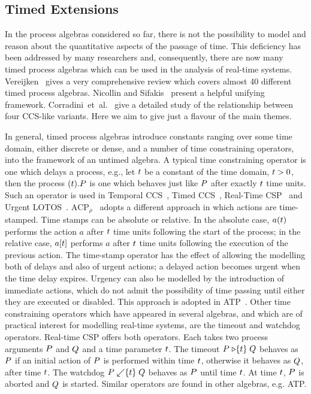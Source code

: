{\subsection{Timed Extensions}
In the process algebras considered so far, there is not the
possibility to model and reason about the quantitative aspects of the
passage of time.  This deficiency has been addressed by many
researchers and, consequently, there are now many timed process
algebras which can be used in the analysis of real-time
systems. Vereijken~\cite{ver:97} gives a very comprehensive review
which covers almost 40 different timed process algebras.  Nicollin and
Sifakis~\cite{ns:91} present a helpful unifying framework.
Corradini~et~al.~\cite{cdi:99} give a detailed study of the
relationship between four CCS-like variants. Here we aim to give just
a flavour of the main themes.

In general, timed process algebras introduce constants ranging over
some time domain, either discrete or dense, and a number of time
constraining operators, into the framework of an untimed algebra. A
typical time constraining operator is one which delays a process,
e.g., let $\ti$ be a constant of the time domain, $\ti > 0$, then the
process $(\ti).\P$ is one which behaves just like $\P$ after exactly
$\ti$ time units. Such an operator is used in Temporal
CCS~\cite{mt:90}, Timed CCS~\cite{wan:90}, Real-Time CSP~\cite{dav:93}
and Urgent LOTOS~\cite{bl:91}.  $\text{ACP}_\rho$~\cite{bb:91} adopts
a different approach in which actions are time-stamped. Time stamps
can be absolute or relative. In the absolute case, $a(\ti)$ performs
the action $a$ after $\ti$ time units following the start of the
process; in the relative case, $a[\ti]$ performs $a$ after $\ti$ time
units following the execution of the previous action. The time-stamp
operator has the effect of allowing the modelling both of delays and
also of urgent actions; a delayed action becomes urgent when the time
delay expires.  Urgency can also be modelled by the introduction of
immediate actions, which do not admit the possibility of time passing
until either they are executed or disabled. This approach is adopted
in ATP~\cite{ns:94}.  Other time constraining operators which have
appeared in several algebras, and which are of practical interest for
modelling real-time systems, are the timeout and watchdog
operators. Real-time CSP offers both operators. Each takes two process
arguments $\P$ and $\Q$ and a time parameter $\ti$. The timeout $\P
\timeout[\ti] \Q$ behaves as $\P$ if an initial action of $\P$ is
performed within time $\ti$, otherwise it behaves as $\Q$, after time
$\ti$. The watchdog $\P \transfer[\ti] \Q$ behaves as $\P$ until time
$\ti$. At time $\ti$, $\P$ is aborted and $\Q$ is started.  Similar
operators are found in other algebras, e.g. ATP. 

}
